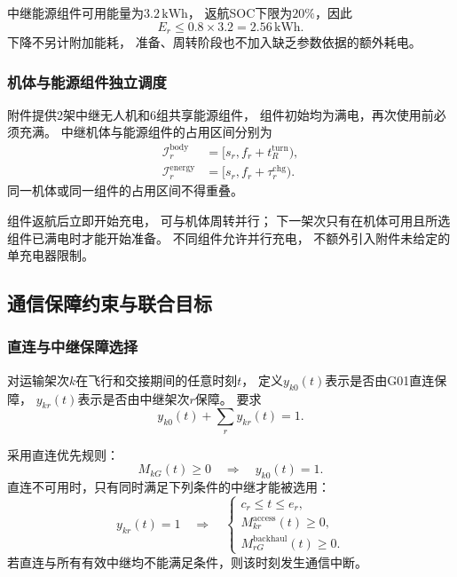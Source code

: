 \documentclass[bwprint]{gmcmthesis}
\begin{document}
中继能源组件可用能量为$3.2\,\mathrm{kWh}$，
返航SOC下限为$20\%$，因此
\begin{equation}
    E_r\leq0.8\times3.2=2.56\,\mathrm{kWh}.
\end{equation}
下降不另计附加能耗，
准备、周转阶段也不加入缺乏参数依据的额外耗电。

\subsubsection{机体与能源组件独立调度}

附件提供2架中继无人机和6组共享能源组件，
组件初始均为满电，再次使用前必须充满。
中继机体与能源组件的占用区间分别为
\begin{align}
    \mathcal{I}_r^{\mathrm{body}}
    &=
    [s_r,f_r+t_R^{\mathrm{turn}}),\\
    \mathcal{I}_r^{\mathrm{energy}}
    &=
    [s_r,f_r+\tau_r^{\mathrm{chg}}).
\end{align}
同一机体或同一组件的占用区间不得重叠。

组件返航后立即开始充电，
可与机体周转并行；
下一架次只有在机体可用且所选组件已满电时才能开始准备。
不同组件允许并行充电，
不额外引入附件未给定的单充电器限制。

\subsection{通信保障约束与联合目标}

\subsubsection{直连与中继保障选择}

对运输架次$k$在飞行和交接期间的任意时刻$t$，
定义$y_{k0}(t)$表示是否由G01直连保障，
$y_{kr}(t)$表示是否由中继架次$r$保障。
要求
\begin{equation}
    y_{k0}(t)+\sum_r y_{kr}(t)=1.
\end{equation}

采用直连优先规则：
\begin{equation}
    M_{kG}(t)\geq0
    \quad\Longrightarrow\quad
    y_{k0}(t)=1.
\end{equation}
直连不可用时，只有同时满足下列条件的中继才能被选用：
\begin{equation}
    y_{kr}(t)=1
    \quad\Longrightarrow\quad
    \begin{cases}
        c_r\leq t\leq e_r,\\
        M_{kr}^{\mathrm{access}}(t)\geq0,\\
        M_{rG}^{\mathrm{backhaul}}(t)\geq0.
    \end{cases}
    \label{eq:q3_relay_coverage}
\end{equation}
若直连与所有有效中继均不能满足条件，则该时刻发生通信中断。
\end{document}
